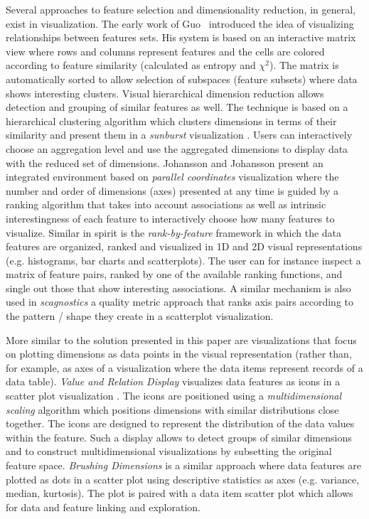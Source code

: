 Several approaches to feature selection and dimensionality reduction, in general, exist in visualization.
The early work of Guo~\cite{Guo2003} introduced the idea of
visualizing relationships between features sets.
His system is based on an interactive matrix view where rows and
columns represent features and the cells are colored according to
feature similarity (calculated as entropy and ${\chi}^2$).
The matrix is automatically sorted to allow selection of subspaces
(feature subsets) where data shows interesting clusters.
Visual hierarchical dimension reduction \cite{wang2003interactive}
allows detection and grouping of similar features as well.
The technique is based on a hierarchical clustering algorithm
which clusters dimensions in terms of their similarity and present
them in a \textit{sunburst} visualization \cite{yang2003interactive}.
Users can interactively choose an aggregation level and use the aggregated
dimensions to display data with the reduced set of dimensions.
Johansson and Johansson \cite{Johansson2009} present an integrated environment based on
\textit{parallel coordinates} visualization where the number and order of
dimensions (axes) presented at any time is guided by a ranking algorithm
that takes into account associations as well as intrinsic interestingness of
each feature to interactively choose how many features to visualize.
Similar in spirit is the \textit{rank-by-feature} framework \cite{seo2005rank} in which
the data features are organized, ranked and visualized in
1D and 2D visual representations
(e.g. histograms, bar charts and scatterplots).
The user can for instance inspect a matrix of feature pairs,
ranked by one of the available ranking functions, and single
out those that show interesting associations.
A similar mechanism is also used in \textit{scagnostics} \cite{wilkinson2005graph} a
quality metric approach \cite{bertini2011quality} that ranks axis pairs according to the pattern / shape they create in a scatterplot visualization.

More similar to the solution presented in this paper are visualizations that
focus on plotting dimensions as data points in the visual representation
(rather than, for example, as axes of a visualization where the data
items represent records of a data table).
\textit{Value and Relation Display} visualizes data features as icons
in a scatter plot visualization \cite{YangPHMWR04}.
The icons are positioned using a \textit{multidimensional scaling}
algorithm which positions dimensions with
similar distributions close together.
The icons are designed to represent the distribution of the
data values within the feature.
Such a display allows to detect groups of similar dimensions
and to construct multidimensional visualizations by subsetting
the original feature space.
\textit{Brushing Dimensions} \cite{Turkay2011} is a similar approach
where data features are plotted as dots in a scatter plot using
descriptive statistics as axes (e.g. variance, median, kurtosis).
The plot is paired with a data item scatter plot which allows for data
and feature linking and exploration.

